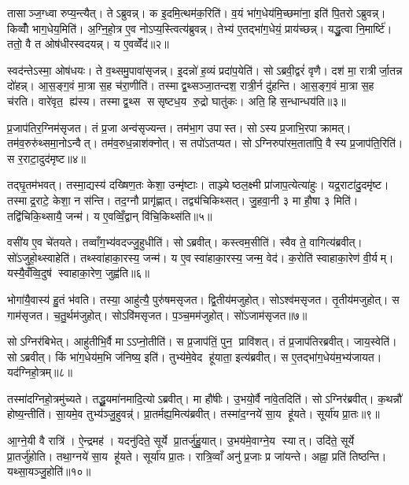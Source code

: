 तासाञ्ज॒ग्ध्वा रुप्य॒न्त्यैत्। तेऽब्रुवन्न्। क इ॒दमि॒त्थम॑क॒रिति॑। व॒यं भा॑ग॒धेय॑मि॒च्छमा॑ना॒ इति॑ पि॒तरोऽब्रुवन्न्। किव्वोँ॑ भाग॒धेय॒मिति॑। अ॒ग्नि॒हो॒त्र ए॒व नोऽप्य॒स्त्वित्य॑ब्रुवन्न्। तेभ्य॑ ए॒तद्भा॑ग॒धेयं॒ प्राय॑च्छन्न्। यद्धु॒त्वा नि॒मार्ष्टि॑। ततो॒ वै त ओष॑धीरस्वदयन्न्। य ए॒वव्वेँद॑॥२॥

स्वद॑न्तेऽस्मा॒ ओष॑धयः। ते व॒थ्समु॒पावा॑सृजन्न्। इ॒दन्नो॑ ह॒व्यं प्रदा॑प॒येति॑। सोऽब्रवी॒द्वरं॑ वृणै। दश॑ मा॒ रात्रीर्जा॒तन्न दो॑हन्न्। आ॒स॒ङ्ग॒वं मा॒त्रा स॒ह च॑रा॒णीति॑। तस्माद्व॒थ्सञ्जा॒तन्दश॒ रात्री॒र्न दु॑हन्ति। आ॒स॒ङ्ग॒वं मा॒त्रा स॒ह च॑रति। वारे॑वृत॒ ह्य॑स्य। तस्माद्व॒थ्स ससृष्टध॒य रु॒द्रो घातु॑कः। अति॒ हि स॒न्धान्धय॑ति॥३॥\anuvakamend[अ॒लि॒म्प॒न्वेद॒ घातु॑क॒ एक॑ञ्च]

प्र॒जाप॑तिर॒ग्निम॑सृजत। तं प्र॒जा अन्व॑सृज्यन्त। तम॑भा॒ग उपास्त। सोऽस्य प्र॒जाभि॒रपाक्रामत्। तम॑व॒रुरु॑थ्समा॒नोऽन्वैत्। तम॑व॒रुध॒न्नाश॑क्नोत्। स तपो॑ऽतप्यत। सोऽग्निरुपा॑रम॒ताता॑पि॒ वै स्य प्र॒जाप॑ति॒रिति॑। स र॒राटा॒दुद॑मृष्ट॥४॥

तद्घृ॒तम॑भवत्। तस्मा॒द्यस्य॑ दख्षिण॒तः केशा॒ उन्मृ॑ष्टाः। ताञ्ज्येष्ठल॒क्ष्मी प्रा॑जाप॒त्येत्या॑हुः। यद्र॒राटा॑दु॒दमृ॑ष्ट। तस्माद्र॒राटे॒ केशा॒ न स॑न्ति। तद॒ग्नौ प्रागृ॑ह्णात्। तद्व्य॑चिकिथ्सत्। जु॒हवा॒नी ३ मा हौ॒षा ३ मिति॑। तद्वि॑चिकि॒थ्सायै॒ जन्म॑। य ए॒वव्विँ॒द्वान् वि॑चि॒किथ्स॑ति॥५॥

वसी॑य ए॒व चे॑तयते। तव्वाँग॒भ्य॑वदज्जु॒हुधीति॑। सोऽब्रवीत्। कस्त्वम॒सीति॑। स्वैव ते॒ वागित्य॑ब्रवीत्। सो॑ऽजुहो॒थ्स्वाहेति॑। तथ्स्वा॑हाका॒रस्य॒ जन्म॑। य ए॒वस्वा॑हाका॒रस्य॒ जन्म॒ वेद॑। क॒रोति॑ स्वाहाका॒रेण॑ वी॒र्यम्। यस्यै॒वँव्वि॒दुष॑ स्वाहाका॒रेण॒ जुह्व॑ति॥६॥

भोगा॑यै॒वास्य॑ हु॒तं भ॑वति। तस्या॒ आहु॑त्यै॒ पुरु॑षमसृजत। द्वि॒तीय॑मजुहोत्। सोऽश्व॑मसृजत। तृ॒तीय॑मजुहोत्। स गाम॑सृजत। च॒तु॒र्थम॑जुहोत्। सोऽवि॑मसृजत। प॒ञ्च॒मम॑जुहोत्। सो॑ऽजाम॑सृजत॥७॥

सोऽग्निर॑बिभेत्। आहु॑तीभि॒र्वै माऽऽप्नो॒तीति॑। स प्र॒जाप॑तिं॒ पुन॒ प्रावि॑शत्। तं प्र॒जाप॑तिरब्रवीत्। जाय॒स्वेति॑। सोऽब्रवीत्। किं भा॑ग॒धेय॑म॒भि ज॑निष्य॒ इति॑। तुभ्य॑मे॒वेद हू॑याता॒ इत्य॑ब्रवीत्। स ए॒तद्भा॑ग॒धेय॑म॒भ्य॑जायत। यद॑ग्निहो॒त्रम्॥८॥

तस्मा॑दग्निहो॒त्रमु॑च्यते। तद्धू॒यमा॑नमादि॒त्योऽब्रवीत्। मा हौ॑षीः। उ॒भयो॒र्वै ना॑वे॒तदिति॑। सोऽग्निर॑ब्रवीत्। क॒थन्नौ॑ होष्य॒न्तीति॑। सा॒यमे॒व तुभ्य॑ञ्जु॒हुवन्न्॑। प्रा॒तर्मह्य॒मित्य॑ब्रवीत्। तस्मा॑द॒ग्नये॑ सा॒य हू॑यते। सूर्या॑य प्रा॒तः॥९॥

आ॒ग्ने॒यी वै रात्रि॑। ऐ॒न्द्रमह॑। यदनु॑दिते॒ सूर्ये प्रा॒तर्जु॑हु॒यात्। उ॒भय॑मे॒वाग्ने॒य स्यात्। उदि॑ते॒ सूर्ये प्रा॒तर्जु॑होति। तथा॒ग्नये॑ सा॒य हू॑यते। सूर्या॑य प्रा॒तः। रात्रि॒व्वाँ अनु॑ प्र॒जाः प्र जा॑यन्ते। अह्ना॒ प्रति॑ तिष्ठन्ति। यथ्सा॒यञ्जु॒होति॑॥१०॥

